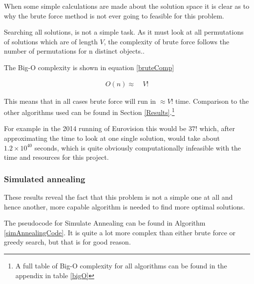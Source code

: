 \documentclass[12pt]{report}
\begin{document}
When some simple calculations are made about the solution space it is clear as to why the brute force method is not ever going to feasible for this problem. 

Searching all solutions, is not a simple task. As it must look at all permutations of solutions which are of length $V$, the complexity of brute force follows the number of permutations for n distinct objects.\cite{Permutation}.

The Big-O complexity is shown in equation \ref{bruteComp}

\begin{equation}\label{bruteComp}
\begin{aligned}
	O(n) \approx{} & \ V!
\end{aligned}
\end{equation}

This means that in all cases brute force will run in $\approx V!$ time. Comparison to the other algorithms used can be found in Section \ref{Results}.\footnote{A full table of Big-O complexity for all algorithms can be found in the appendix in table \ref{bigO}}

For example in the 2014 running of Eurovision this would be $37!$ which, after approximating the time to look at one single solution, would take about $1.2\times10^{40}$ seconds, which is quite obviously computationally infeasible with the time and resources for this project.

\subsubsection{Simulated annealing}
These results reveal the fact that this problem is not a simple one at all and hence another, more capable algorithm is needed to find more optimal solutions. 

The pseudocode for Simulate Annealing can be found in Algorithm \ref{simAnnealingCode}. It is quite a lot more complex than either brute force or greedy search, but that is for good reason.
\end{document}
